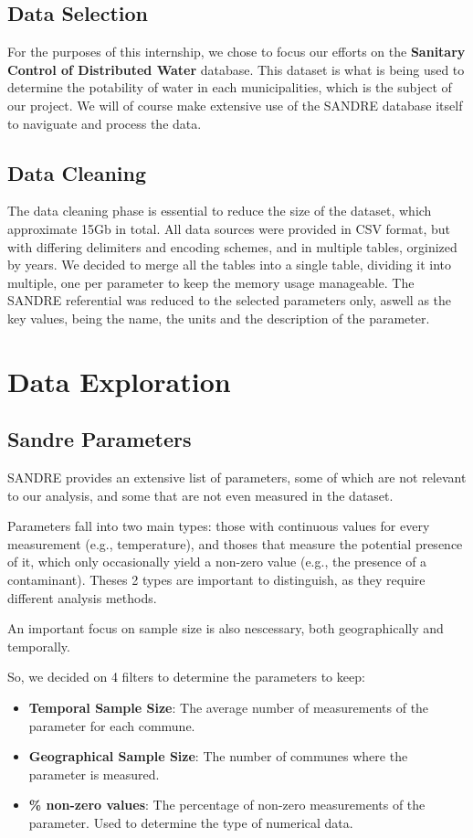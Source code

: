 \documentclass{article}
\begin{document}
\subsection{Data Selection}


For the purposes of this internship, we chose to focus our efforts on the \textbf{Sanitary Control of Distributed Water} database. 
This dataset is what is being used to determine the potability of water in each municipalities, which is the subject of our project.
We will of course make extensive use of the SANDRE database itself to naviguate and process the data. 

\newpage
\subsection{Data Cleaning}
The data cleaning phase is essential to reduce the size of the dataset, which approximate 15Gb in total.
All data sources were provided in CSV format, but with differing delimiters and encoding schemes, and in multiple tables, orginized by years.
We decided to merge all the tables into a single table, dividing it into multiple, one per parameter to keep the memory usage manageable.
The SANDRE referential was reduced to the selected parameters only, aswell as the key values, being the name, the units and the description of the parameter.


\section{Data Exploration}

\subsection{Sandre Parameters}
SANDRE provides an extensive list of parameters, some of which are not relevant to our analysis, and some that are not even measured in the dataset.

Parameters fall into two main types: those with continuous values for every measurement (e.g., temperature), 
and thoses that measure the potential presence of it, which only occasionally yield a non-zero value (e.g., the presence of a contaminant).
Theses 2 types are important to distinguish, as they require different analysis methods.

An important focus on sample size is also nescessary, both geographically and temporally.

So, we decided on 4 filters to determine the parameters to keep:
\begin{itemize}
    \item \textbf{Temporal Sample Size}: The average number of measurements of the parameter for each commune.
    \item \textbf{Geographical Sample Size}: The number of communes where the parameter is measured.
    \item \textbf{\% non-zero values}: The percentage of non-zero measurements of the parameter. Used to determine the type of numerical data.
\end{itemize}
\end{document}

